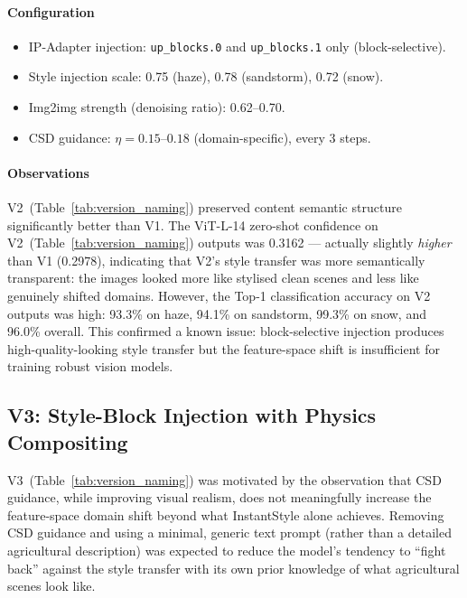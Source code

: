 \paragraph{Configuration}
\begin{itemize}
    \item IP-Adapter injection: \texttt{up\_blocks.0} and \texttt{up\_blocks.1} only (block-selective).
    \item Style injection scale: 0.75 (haze), 0.78 (sandstorm), 0.72 (snow).
    \item Img2img strength (denoising ratio): 0.62--0.70.
    \item CSD guidance: $\eta = 0.15$--$0.18$ (domain-specific), every 3 steps.
\end{itemize}

\paragraph{Observations}
V2~(Table~\ref{tab:version_naming}) preserved content semantic structure significantly better than V1. The ViT-L-14 zero-shot confidence on V2~(Table~\ref{tab:version_naming}) outputs was 0.3162 — actually slightly \emph{higher} than V1 (0.2978), indicating that V2's style transfer was more semantically transparent: the images looked more like stylised clean scenes and less like genuinely shifted domains. However, the Top-1 classification accuracy on V2 outputs was high: 93.3\% on haze, 94.1\% on sandstorm, 99.3\% on snow, and 96.0\% overall. This confirmed a known issue: block-selective injection produces high-quality-looking style transfer but the feature-space shift is insufficient for training robust vision models.

\FloatBarrier
\subsection{V3: Style-Block Injection with Physics Compositing}
\label{sec:v3}

\noindent V3~(Table~\ref{tab:version_naming}) was motivated by the observation that CSD guidance, while improving visual realism, does not meaningfully increase the feature-space domain shift beyond what InstantStyle alone achieves. Removing CSD guidance and using a minimal, generic text prompt (rather than a detailed agricultural description) was expected to reduce the model's tendency to ``fight back'' against the style transfer with its own prior knowledge of what agricultural scenes look like.

